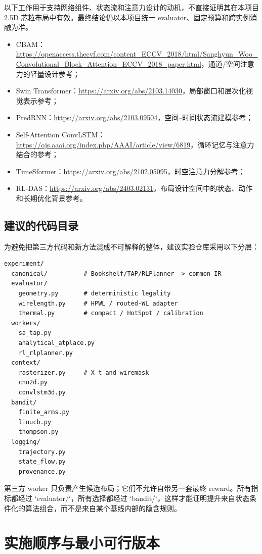 \documentclass[UTF8,a4paper,11pt]{ctexart}
\newcommand{\urlbreak}[1]{\url{#1}}
\begin{document}
以下工作用于支持网络组件、状态流和注意力设计的动机，不直接证明其在本项目 2.5D 芯粒布局中有效。最终结论仍以本项目统一 evaluator、固定预算和跨实例消融为准。

\begin{itemize}
    \item CBAM：\urlbreak{https://openaccess.thecvf.com/content_ECCV_2018/html/Sanghyun_Woo_Convolutional_Block_Attention_ECCV_2018_paper.html}，通道/空间注意力的轻量设计参考；
    \item Swin Transformer：\urlbreak{https://arxiv.org/abs/2103.14030}，局部窗口和层次化视觉表示参考；
    \item PredRNN：\urlbreak{https://arxiv.org/abs/2103.09504}，空间--时间状态流建模参考；
    \item Self-Attention ConvLSTM：\urlbreak{https://ojs.aaai.org/index.php/AAAI/article/view/6819}，循环记忆与注意力结合的参考；
    \item TimeSformer：\urlbreak{https://arxiv.org/abs/2102.05095}，时空注意力分解参考；
    \item RL-DAS：\urlbreak{https://arxiv.org/abs/2403.02131}，布局设计空间中的状态、动作和长期优化背景参考。
\end{itemize}

\subsection{建议的代码目录}

为避免把第三方代码和新方法混成不可解释的整体，建议实验仓库采用以下分层：

\begin{verbatim}
experiment/
  canonical/          # Bookshelf/TAP/RLPlanner -> common IR
  evaluator/
    geometry.py       # deterministic legality
    wirelength.py     # HPWL / routed-WL adapter
    thermal.py        # compact / HotSpot / calibration
  workers/
    sa_tap.py
    analytical_atplace.py
    rl_rlplanner.py
  context/
    rasterizer.py     # X_t and wiremask
    cnn2d.py
    convlstm3d.py
  bandit/
    finite_arms.py
    linucb.py
    thompson.py
  logging/
    trajectory.py
    state_flow.py
    provenance.py
\end{verbatim}

第三方 worker 只负责产生候选布局；它们不允许自带另一套最终 reward。所有指标都经过 `evaluator/`，所有选择都经过 `bandit/`，这样才能证明提升来自状态条件化的算法组合，而不是来自某个基线内部的隐含规则。

\section{实施顺序与最小可行版本}
\end{document}
